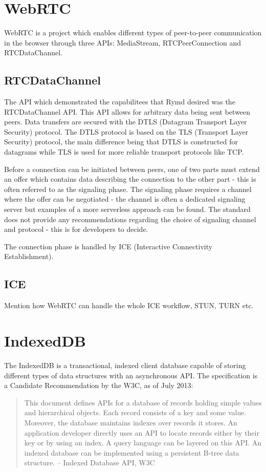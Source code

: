 \section{WebRTC}
WebRTC is a project which enables different types of peer-to-peer communication in the browser through three APIs: MediaStream, RTCPeerConnection and RTCDataChannel.

\subsection{RTCDataChannel}
The API which demonstrated the capabilitees that Rymd desired was the RTCDataChannel API. This API allows for arbitrary data being sent between peers. Data transfers are secured with the DTLS (Datagram Transport Layer Security) protocol. The DTLS protocol is based on the TLS (Transport Layer Security) protocol, the main difference being that DTLS is constructed for datagrams while TLS is used for more reliable transport protocols like TCP.

Before a connection can be initiated between peers, one of two parts must extend an offer which contains data describing the connection to the other part - this is often referred to as the signaling phase. The signaling phase requires a channel where the offer can be negotiated - the channel is often a dedicated signaling server but examples of a more serverless approach can be found\cite{webrtcsignalserver}. The standard does not provide any recommendations regarding the choice of signaling channel and protocol - this is for developers to decide.

The connection phase is handled by ICE (Interactive Connectivity Establishment).

\subsection{ICE}
Mention how WebRTC can handle the whole ICE workflow, STUN, TURN etc.

\section{IndexedDB}
The IndexedDB is a transactional, indexed client database capable of storing different types of data structures with an asynchronous API. The specification is a Candidate Recommendation by the W3C, as of July 2013:

\begin{quote}
This document defines APIs for a database of records holding simple values and hierarchical objects. Each record consists of a key and some value. Moreover, the database maintains indexes over records it stores. An application developer directly uses an API to locate records either by their key or by using an index. A query language can be layered on this API. An indexed database can be implemented using a persistent B-tree data structure.
– Indexed Database API, W3C
\end{quote}

